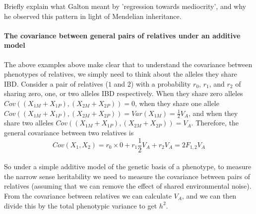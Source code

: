 \begin{question}
Briefly explain what Galton meant by 'regression towards
mediocrity', and why he observed this pattern in light of Mendelian inheritance.
\end{question}



\paragraph{The covariance between general pairs of relatives under an
additive model}


The above examples above make clear that to understand the covariance between
phenotypes of relatives, we simply need to think about the alleles they
share IBD. Consider a pair of relatives ($1$ and $2$) with a probability $r_0$,
$r_1$, and $r_2$ of sharing zero, one, or two alleles IBD
respectively. When they share zero alleles
$Cov((X_{1M}+X_{1P}),(X_{2M}+X_{2P}))=0$, when they share one allele
$Cov((X_{1M}+X_{1P}),(X_{2M}+X_{2P}))=
Var(X_{1M})=\frac{1}{2}V_A$, and when they share two alleles $Cov((X_{1M}+X_{1P}),(X_{2M}+X_{2P}))=
V_A$. Therefore, the general covariance between two
relatives is
\begin{equation}
Cov(X_1,X_2) = r_0 \times 0 + r_1 \frac{1}{2}V_A + r_2  V_A =
2 F_{1,2} V_A  \label{additive_covar_general_rellys}
\end{equation}\\ 
So under a simple additive model of the genetic basis of a phenotype,
to measure the narrow sense heritability we need to measure the
covariance between pairs of relatives (assuming that we can remove the effect of
shared environmental noise). From the covariance between relatives we
can calculate $V_A$, and we can then divide this by the total phenotypic
variance to get $h^2$. \\

